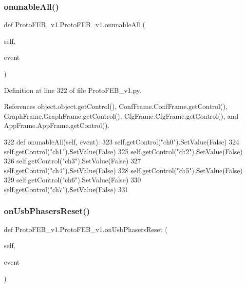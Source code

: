\subsubsection{\texorpdfstring{onunable\+All()}{onunableAll()}}
{\footnotesize\ttfamily def Proto\+F\+E\+B\+\_\+v1.\+Proto\+F\+E\+B\+\_\+v1.\+onunable\+All (\begin{DoxyParamCaption}\item[{}]{self,  }\item[{}]{event }\end{DoxyParamCaption})}



Definition at line 322 of file Proto\+F\+E\+B\+\_\+v1.\+py.



References object.\+object.\+get\+Control(), Conf\+Frame.\+Conf\+Frame.\+get\+Control(), Graph\+Frame.\+Graph\+Frame.\+get\+Control(), Cfg\+Frame.\+Cfg\+Frame.\+get\+Control(), and App\+Frame.\+App\+Frame.\+get\+Control().


\begin{DoxyCode}
322     \textcolor{keyword}{def }onunableAll(self, event):
323         self.getControl(\textcolor{stringliteral}{"ch0"}).SetValue(\textcolor{keyword}{False})
324         self.getControl(\textcolor{stringliteral}{"ch1"}).SetValue(\textcolor{keyword}{False})
325         self.getControl(\textcolor{stringliteral}{"ch2"}).SetValue(\textcolor{keyword}{False})
326         self.getControl(\textcolor{stringliteral}{"ch3"}).SetValue(\textcolor{keyword}{False})
327         self.getControl(\textcolor{stringliteral}{"ch4"}).SetValue(\textcolor{keyword}{False})
328         self.getControl(\textcolor{stringliteral}{"ch5"}).SetValue(\textcolor{keyword}{False})
329         self.getControl(\textcolor{stringliteral}{"ch6"}).SetValue(\textcolor{keyword}{False})
330         self.getControl(\textcolor{stringliteral}{"ch7"}).SetValue(\textcolor{keyword}{False})
331 
\end{DoxyCode}
\mbox{\label{classProtoFEB__v1_1_1ProtoFEB__v1_af5cbe00aedb8c9addca6edae4b6fd33c}} 
\subsubsection{\texorpdfstring{on\+Usb\+Phasers\+Reset()}{onUsbPhasersReset()}}
{\footnotesize\ttfamily def Proto\+F\+E\+B\+\_\+v1.\+Proto\+F\+E\+B\+\_\+v1.\+on\+Usb\+Phasers\+Reset (\begin{DoxyParamCaption}\item[{}]{self,  }\item[{}]{event }\end{DoxyParamCaption})}



